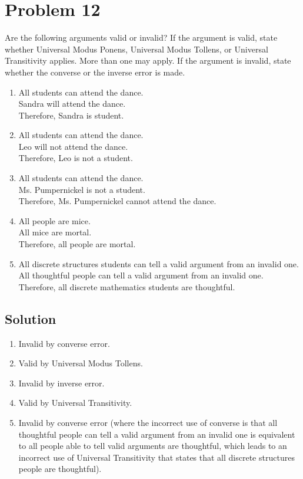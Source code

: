 \documentclass[table]{article}
\begin{document}
\section{Problem 12}
Are the following arguments valid or invalid? If the argument is valid, state whether Universal Modus Ponens, Universal Modus Tollens, or Universal Transitivity applies. More than one may apply. If the argument is invalid, state whether the converse or the inverse error
is made.
\begin{enumerate}[nosep, label=\alph*)]
\item All students can attend the dance.\\Sandra will attend the dance.\\Therefore, Sandra is student.
\item All students can attend the dance.\\Leo will not attend the dance.\\Therefore, Leo is not a student.
\item All students can attend the dance.\\Ms. Pumpernickel is not a student.\\Therefore, Ms. Pumpernickel cannot attend the dance.
\item All people are mice.\\All mice are mortal.\\Therefore, all people are mortal.
\item All discrete structures students can tell a valid argument from an invalid one.\\All thoughtful people can tell a valid argument from an invalid one.\\Therefore, all discrete mathematics students are thoughtful.
\end{enumerate}
\subsection{Solution}
\begin{enumerate}[nosep, label=\alph*)]
\item Invalid by converse error.
\item Valid by Universal Modus Tollens.
\item Invalid by inverse error.
\item Valid by Universal Transitivity.
\item Invalid by converse error (where the incorrect use of converse is that all thoughtful people can tell a valid argument from an invalid one is equivalent to all people able to tell valid arguments are thoughtful, which leads to an incorrect use of Universal Transitivity that states that all discrete structures people are thoughtful).
\end{enumerate}
\end{document}
